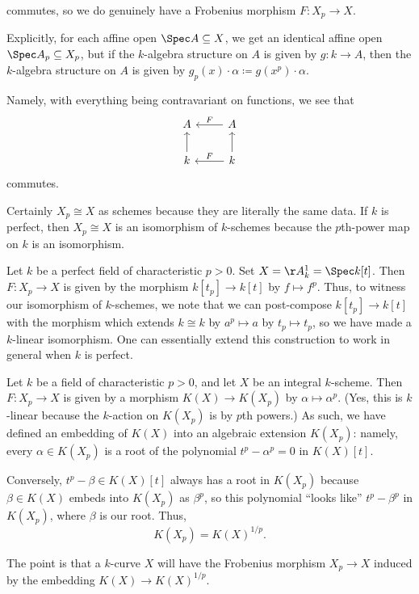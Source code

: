 \documentclass[../notes.tex]{subfiles}
\begin{document}
commutes, so we do genuinely have a Frobenius morphism $F\colon X_p\to X$.
\begin{remark}
	Explicitly, for each affine open $\Spec A\subseteq X$, we get an identical affine open $\Spec A_p\subseteq X_p$, but if the $k$-algebra structure on $A$ is given by $g\colon k\to A$, then the $k$-algebra structure on $A$ is given by $g_p(x)\cdot\alpha\coloneqq g\left(x^p\right)\cdot\alpha$.
\end{remark}
Namely, with everything being contravariant on functions, we see that
\[\begin{tikzcd}
	A & A \\
	k & k
	\arrow["F"', from=2-2, to=2-1]
	\arrow["F"', from=1-2, to=1-1]
	\arrow[from=2-2, to=1-2]
	\arrow[from=2-1, to=1-1]
\end{tikzcd}\]
commutes.
\begin{remark}
	Certainly $X_p\cong X$ as schemes because they are literally the same data. If $k$ is perfect, then $X_p\cong X$ is an isomorphism of $k$-schemes because the $p$th-power map on $k$ is an isomorphism.
\end{remark}
\begin{example} \label{ex:perf-xp-is-x}
	Let $k$ be a perfect field of characteristic $p>0$. Set $X=\AA^1_k=\Spec k[t]$. Then $F\colon X_p\to X$ is given by the morphism $k[t_p]\to k[t]$ by $f\mapsto f^p$. Thus, to witness our isomorphism of $k$-schemes, we note that we can post-compose $k[t_p]\to k[t]$ with the morphism which extends $k\cong k$ by $a^p\mapsto a$ by $t_p\mapsto t_p$, so we have made a $k$-linear isomorphism. One can essentially extend this construction to work in general when $k$ is perfect.
\end{example}
\begin{example}
	Let $k$ be a field of characteristic $p>0$, and let $X$ be an integral $k$-scheme. Then $F\colon X_p\to X$ is given by a morphism $K(X)\to K(X_p)$ by $\alpha\mapsto\alpha^p$. (Yes, this is $k$-linear because the $k$-action on $K(X_p)$ is by $p$th powers.) As such, we have defined an embedding of $K(X)$ into an algebraic extension $K(X_p)$: namely, every $\alpha\in K(X_p)$ is a root of the polynomial $t^p-\alpha^p=0$ in $K(X)[t]$.
	
	Conversely, $t^p-\beta\in K(X)[t]$ always has a root in $K(X_p)$ because $\beta\in K(X)$ embeds into $K(X_p)$ as $\beta^p$, so this polynomial ``looks like'' $t^p-\beta^p$ in $K(X_p)$, where $\beta$ is our root. Thus,
	\[K(X_p)=K(X)^{1/p}.\]
\end{example}
The point is that a $k$-curve $X$ will have the Frobenius morphism $X_p\to X$ induced by the embedding $K(X)\to K(X)^{1/p}$.
\end{document}
